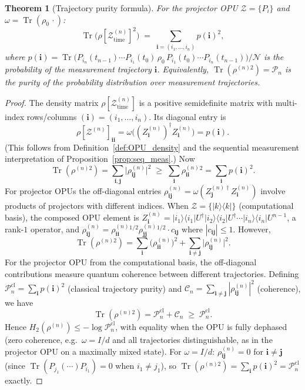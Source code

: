 \documentclass[12pt,a4paper]{article}
\newtheorem{theorem}{Theorem}[section]
\DeclareMathOperator{\Tr}{Tr}
\begin{document}
\begin{theorem}[Trajectory purity formula]
  \label{thm:traj_purity}
  For the projector OPU $\mathcal{Z}=\{P_i\}$ and $\omega=\Tr(\rho_0\,\cdot)$:
  \[
    \Tr\!\bigl(\rho[\mathcal{Z}^{(n)}_{\mathrm{time}}]^2\bigr)
    \;=\; \sum_{\mathbf{i}=(i_1,\ldots,i_n)} p(\mathbf{i})^2,
  \]
  where $p(\mathbf{i}) = \Tr\!\bigl(P_{i_n}(t_{n-1})\cdots P_{i_1}(t_0)\,\rho_0\,
  P_{i_1}(t_0)\cdots P_{i_n}(t_{n-1})\bigr) / \mathcal{N}$
  is the probability of the measurement trajectory $\mathbf{i}$.
  Equivalently, $\Tr(\rho^{(n)2}) = \mathcal{P}_n$ is the \emph{purity of the
  probability distribution over measurement trajectories}.
\end{theorem}
\begin{proof}
  The density matrix $\rho[\mathcal{Z}^{(n)}_{\mathrm{time}}]$ is a positive
  semidefinite matrix with multi-index rows/columns
  $(\mathbf{i})=(i_1,\ldots,i_n)$.  Its diagonal entry is
  \[
    \rho[\mathcal{Z}^{(n)}]_{\mathbf{i}\mathbf{i}}
    = \omega\!\bigl((Z^{(n)}_\mathbf{i})^\dagger Z^{(n)}_\mathbf{i}\bigr)
    = p(\mathbf{i}).
  \]
  (This follows from Definition~\ref{def:OPU_density} and the sequential measurement
  interpretation of Proposition~\ref{prop:seq_meas}.)
  Now
  \[
    \Tr(\rho^{(n)2}) = \sum_{\mathbf{i},\mathbf{j}}\bigl|\rho^{(n)}_{\mathbf{i}\mathbf{j}}\bigr|^2
    \;\geq\; \sum_{\mathbf{i}} \rho^{(n)}_{\mathbf{i}\mathbf{i}}{}^2
    = \sum_\mathbf{i} p(\mathbf{i})^2.
  \]
  For projector OPUs the off-diagonal entries
  $\rho^{(n)}_{\mathbf{i}\mathbf{j}} = \omega(Z^{(n)\dagger}_\mathbf{j}Z^{(n)}_\mathbf{i})$
  involve products of projectors with different indices.  When
  $\mathcal{Z}=\{|k\rangle\langle k|\}$ (computational basis), the composed OPU
  element is $Z^{(n)}_\mathbf{i} = |i_1\rangle\langle i_1|
  U^\dagger|i_2\rangle\langle i_2|U^\dagger\cdots|i_n\rangle\langle i_n|U^{n-1}$,
  a rank-$1$ operator, and
  $\rho^{(n)}_{\mathbf{i}\mathbf{j}} = \rho^{(n)}_{\mathbf{i}\mathbf{i}}^{1/2}
  \rho^{(n)}_{\mathbf{j}\mathbf{j}}^{1/2}\cdot c_{\mathbf{i}\mathbf{j}}$
  where $|c_{\mathbf{i}\mathbf{j}}|\leq 1$.  However,
  \[
    \Tr(\rho^{(n)2}) = \sum_\mathbf{i}\bigl(\rho^{(n)}_{\mathbf{i}\mathbf{i}}\bigr)^2
    + \sum_{\mathbf{i}\ne\mathbf{j}}\bigl|\rho^{(n)}_{\mathbf{i}\mathbf{j}}\bigr|^2.
  \]
  For the projector OPU from the computational basis, the off-diagonal
  contributions measure quantum coherence between different trajectories.
  Defining $\mathcal{P}_n^{\mathrm{cl}} = \sum_\mathbf{i} p(\mathbf{i})^2$
  (classical trajectory purity) and
  $\mathcal{C}_n = \sum_{\mathbf{i}\ne\mathbf{j}}|\rho^{(n)}_{\mathbf{i}\mathbf{j}}|^2$
  (coherence), we have
  \[
    \Tr(\rho^{(n)2}) = \mathcal{P}_n^{\mathrm{cl}} + \mathcal{C}_n
    \;\geq\; \mathcal{P}_n^{\mathrm{cl}}.
  \]
  Hence $H_2(\rho^{(n)}) \leq -\log\mathcal{P}_n^{\mathrm{cl}}$, with equality when
  the OPU is fully dephased (zero coherence, e.g.\ $\omega = I/d$ and all
  trajectories distinguishable, as in the projector OPU on a maximally
  mixed state).  For $\omega = I/d$: $\rho^{(n)}_{\mathbf{i}\mathbf{j}}=0$ for
  $\mathbf{i}\ne\mathbf{j}$ (since $\Tr(P_{j_1}(\cdots)P_{i_1}) = 0$ when
  $i_1\ne j_1$), so $\Tr(\rho^{(n)2})=\sum_\mathbf{i} p(\mathbf{i})^2 =
  \mathcal{P}_n^{\mathrm{cl}}$ exactly.
\end{proof}
\end{document}
